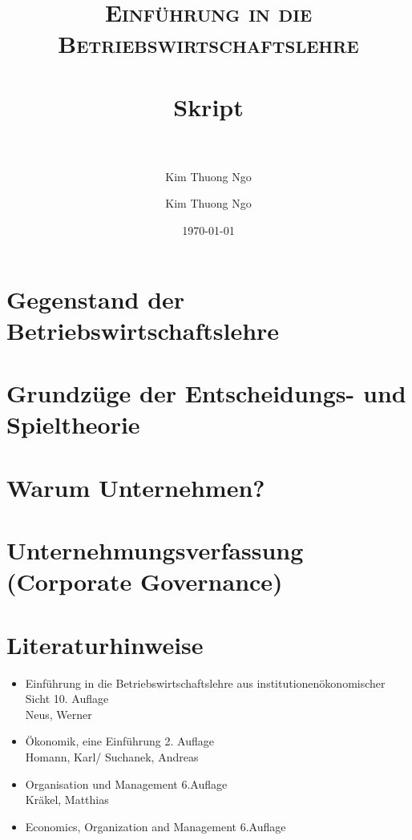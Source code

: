 \documentclass[paper=a4, fontsize=11pt]{scrartcl}
\author{Kim Thuong Ngo}
\title{
\normalfont \normalsize
\textsc{Einführung in die Betriebswirtschaftslehre} \\ [25pt]
\horrule{0.5pt} \\[0.4cm]
\huge Skript \\
\horrule{2pt} \\[0.5cm]
}
\author{Kim Thuong Ngo}
\date{\normalsize\today}
\numberwithin{equation}{section}
\numberwithin{figure}{section}
\numberwithin{table}{section}
\begin{document}
\maketitle

\newpage

\tableofcontents


\newpage

\section{Gegenstand der Betriebswirtschaftslehre}




\newpage

\section{Grundzüge der Entscheidungs- und Spieltheorie}


\newpage

\section{Warum Unternehmen?}


\newpage

\section{Unternehmungsverfassung (Corporate Governance)}


\newpage

\section{Literaturhinweise}

\begin{itemize}
\item Einführung in die Betriebswirtschaftslehre aus institutionenökonomischer Sicht
10. Auflage \\
Neus, Werner 
\item Ökonomik, eine Einführung
2. Auflage \\
Homann, Karl/ Suchanek, Andreas
\item Organisation und Management
6.Auflage \\
Kräkel, Matthias
\item Economics, Organization and Management
6.Auflage \\
\end{itemize}

\end{document}
